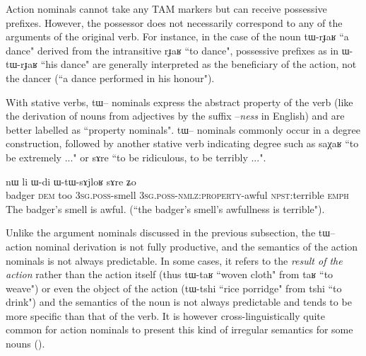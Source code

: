 \documentclass[oldfontcommands,oneside,a4paper,11pt]{article}
\newcommand{\ipa}[1]{{\phon \mbox{#1}}} %
\begin{document}
Action nominals cannot take any TAM markers but  can receive possessive prefixes. However, the possessor does not   necessarily correspond to any of the arguments of the original verb. For instance, in the case of the noun \ipa{tɯ-rɟaʁ} ``a dance" derived from the intransitive \ipa{rɟaʁ} ``to dance", possessive prefixes as in  \ipa{ɯ-tɯ-rɟaʁ} ``his dance" are generally interpreted as the beneficiary of the action, not the dancer (``a dance performed in his honour").



With stative verbs, \ipa{tɯ}-- nominals express the abstract property of the verb (like the derivation of  nouns from adjectives by the suffix --\textit{ness} in English) and are better labelled as ``property nominals".  \ipa{tɯ}-- nominals  commonly occur in a degree construction, followed by another stative verb indicating degree such as \ipa{saχaʁ} ``to be extremely ..." or \ipa{sɤre} ``to be ridiculous, to be terribly ...".
\begin{exe}
\ex
\gll \ipa{βɣɯz}   	\ipa{nɯ}   	\ipa{li}   	\ipa{ɯ-di}   	\ipa{ɯ-tɯ-sɤjloʁ}   	\ipa{sɤre}   	\ipa{ʑo}   \\
badger \textsc{dem} too \textsc{3sg.poss}-smell \textsc{3sg.poss}-\textsc{nmlz:property}-awful \textsc{npst}:terrible \textsc{emph} \\
\glt The badger's smell is awful. (``the badger's smell's awfullness is terrible").
\end{exe}



Unlike the argument nominals discussed in the previous subsection, the \ipa{tɯ}-- action nominal derivation is not fully productive, and the semantics of the action nominals is not always predictable. In some cases, it refers  to the \textit{result of the action} rather than the action itself (thus \ipa{tɯ-taʁ} ``woven cloth" from \ipa{taʁ} ``to weave") or even the object of the action (\ipa{tɯ-tshi} ``rice porridge" from \ipa{tshi} ``to drink") and the semantics of the noun is not always predictable and tends to be more specific than that of the verb. It is however cross-linguistically quite common for action nominals to  present this kind of irregular semantics for some nouns (\citealt[20-21]{koptjevskaja93nmlz}). 
\end{document}
